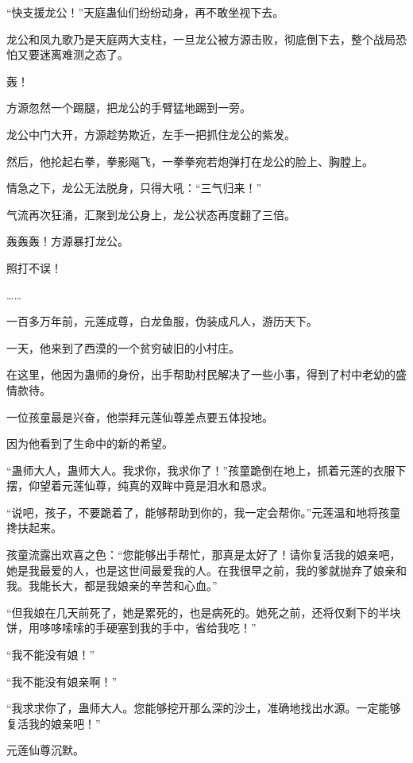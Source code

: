 
\begin{this_body}

“快支援龙公！”天庭蛊仙们纷纷动身，再不敢坐视下去。

龙公和凤九歌乃是天庭两大支柱，一旦龙公被方源击败，彻底倒下去，整个战局恐怕又要迷离难测之态了。

轰！

方源忽然一个踢腿，把龙公的手臂猛地踢到一旁。

龙公中门大开，方源趁势欺近，左手一把抓住龙公的紫发。

然后，他抡起右拳，拳影飚飞，一拳拳宛若炮弹打在龙公的脸上、胸膛上。

情急之下，龙公无法脱身，只得大吼：“三气归来！”

气流再次狂涌，汇聚到龙公身上，龙公状态再度翻了三倍。

轰轰轰！方源暴打龙公。

照打不误！

……

一百多万年前，元莲成尊，白龙鱼服，伪装成凡人，游历天下。

一天，他来到了西漠的一个贫穷破旧的小村庄。

在这里，他因为蛊师的身份，出手帮助村民解决了一些小事，得到了村中老幼的盛情款待。

一位孩童最是兴奋，他崇拜元莲仙尊差点要五体投地。

因为他看到了生命中的新的希望。

“蛊师大人，蛊师大人。我求你，我求你了！”孩童跪倒在地上，抓着元莲的衣服下摆，仰望着元莲仙尊，纯真的双眸中竟是泪水和恳求。

“说吧，孩子，不要跪着了，能够帮助到你的，我一定会帮你。”元莲温和地将孩童搀扶起来。

孩童流露出欢喜之色：“您能够出手帮忙，那真是太好了！请你复活我的娘亲吧，她是我最爱的人，也是这世间最爱我的人。在我很早之前，我的爹就抛弃了娘亲和我。我能长大，都是我娘亲的辛苦和心血。”

“但我娘在几天前死了，她是累死的，也是病死的。她死之前，还将仅剩下的半块饼，用哆哆嗦嗦的手硬塞到我的手中，省给我吃！”

“我不能没有娘！”

“我不能没有娘亲啊！”

“我求求你了，蛊师大人。您能够挖开那么深的沙土，准确地找出水源。一定能够复活我的娘亲吧！”

元莲仙尊沉默。


\end{this_body}
